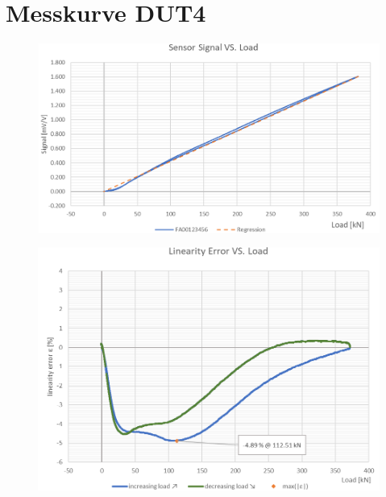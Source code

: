 \documentclass[12pt,a4paper]{article}
\begin{document}
	\section{Messkurve DUT4}
\begin{figure}[H]
	\centering
	\includegraphics[width=.8\linewidth]{img/screenshot007}
	\label{fig:screenshot007}
\end{figure}
\begin{figure}[H]
	\centering
	\includegraphics[width=.8\linewidth]{img/screenshot008}
	\label{fig:screenshot008}
\end{figure}
\end{document}
